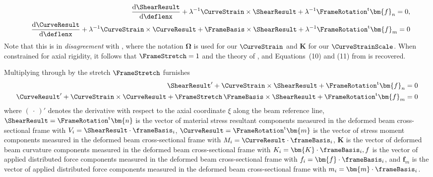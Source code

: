   \begin{equation*}
  \begin{aligned}
  \frac{\mathrm{d} \ShearResult}{\mathrm{d} \deflenx}+ \lambda^{-1} \CurveStrain \times \ShearResult + \lambda^{-1} \FrameRotation^{\mathrm{t}}\bm{f}_n = 0,\\
  \quad \frac{\mathrm{d} \CurveResult}{\mathrm{d} \deflenx} + \lambda^{-1} \CurveStrain \times \CurveResult + \FrameBasis \times \ShearResult+ \lambda^{-1} \FrameRotation^{\mathrm{t}}\bm{f}_m=0
  \end{aligned}
  \end{equation*}
  Note that this is in \emph{disagreement} with \cite{simo1991geometricallyexact}, where the notation \(\bm{\Omega}\) is used for our \(\CurveStrain\) and \(\bm{K}\) for our \(\CurveStrainScale\).
When constrained for axial rigidity, it follows that \(\FrameStretch = 1\) and the theory of \textcite{cosserat1908theorie}, and Equations~(10) and (11) from \textcite[387-388]{love1944treatise} is recovered.

Multiplying through by the stretch \(\FrameStretch\) furnishes
\begin{equation}
\begin{aligned}
\ShearResult^{\prime}+\CurveStrain \times \ShearResult + \FrameRotation^{\mathrm{t}}\bm{f}_n =0 \\
\CurveResult^{\prime}+\CurveStrain \times \CurveResult + \FrameStretch \, \FrameBasis \times \ShearResult + \FrameRotation^{\mathrm{t}}\bm{f}_{m}=0
\end{aligned}
\label{eq:exact-euler-MatDefEquil}
\end{equation}
where \((~\cdot~)'\) denotes the derivative with respect to the axial coordinate $\xi$ along the beam reference line, 
\(\ShearResult=\FrameRotation^{\mathrm{t}}\bm{n}\) is the vector of material stress resultant components measured in the deformed beam cross-sectional frame with $V_i=\ShearResult \cdot \frameBasis_i$, 
\(\CurveResult=\FrameRotation^{\mathrm{t}}\bm{m}\) is the vector of stress moment components measured in the deformed beam cross-sectional frame with \(M_i=\CurveResult \cdot \frameBasis_i\), \(\bm{K}\) is the vector of deformed beam curvature components measured in the deformed beam cross-sectional frame with $K_i=\bm{K} \cdot \frameBasis_i, f$ is the vector of applied distributed force components measured in the deformed beam cross-sectional frame with $f_i=\bm{f} \cdot \frameBasis_i$, and $\bm{f}_{m}$ is the vector of applied distributed force components measured in the deformed beam cross-sectional frame with $m_i=\bm{m} \cdot \frameBasis_i$. 

